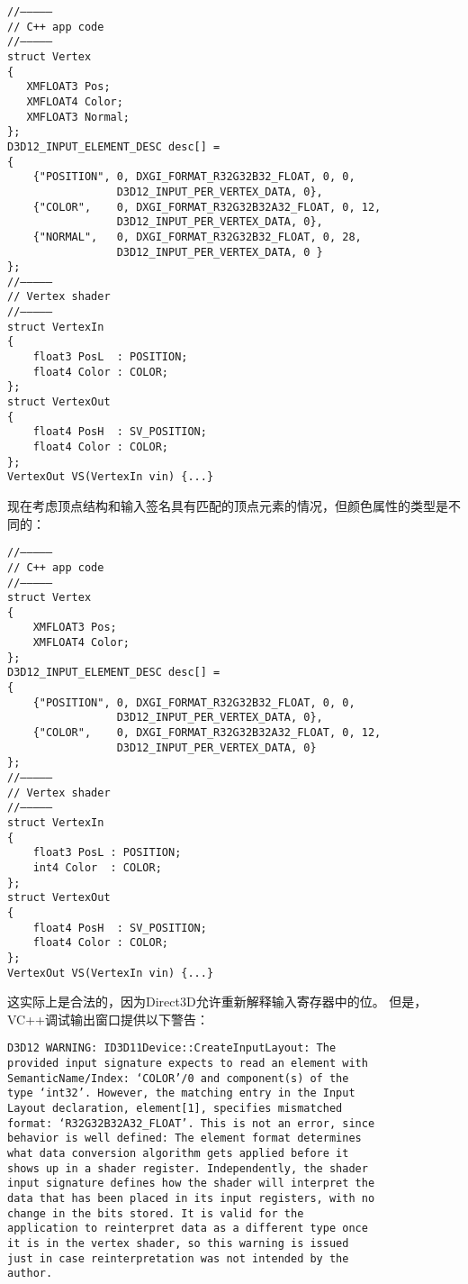 \begin{lstlisting}
//––––—
// C++ app code
//––––—
struct Vertex
{
   XMFLOAT3 Pos;
   XMFLOAT4 Color;
   XMFLOAT3 Normal;
};
D3D12_INPUT_ELEMENT_DESC desc[] =
{
    {"POSITION", 0, DXGI_FORMAT_R32G32B32_FLOAT, 0, 0,
                 D3D12_INPUT_PER_VERTEX_DATA, 0},
    {"COLOR",    0, DXGI_FORMAT_R32G32B32A32_FLOAT, 0, 12,
                 D3D12_INPUT_PER_VERTEX_DATA, 0},
    {"NORMAL",   0, DXGI_FORMAT_R32G32B32_FLOAT, 0, 28,
                 D3D12_INPUT_PER_VERTEX_DATA, 0 }
};
//––––—
// Vertex shader
//––––—
struct VertexIn
{
    float3 PosL  : POSITION;
    float4 Color : COLOR;
};
struct VertexOut
{
    float4 PosH  : SV_POSITION;
    float4 Color : COLOR;
};
VertexOut VS(VertexIn vin) {...}
\end{lstlisting}
\begin{flushleft}
现在考虑顶点结构和输入签名具有匹配的顶点元素的情况，但颜色属性的类型是不同的：\\
\end{flushleft}
\begin{lstlisting}
//––––—
// C++ app code
//––––—
struct Vertex
{
    XMFLOAT3 Pos;
    XMFLOAT4 Color;
};
D3D12_INPUT_ELEMENT_DESC desc[] =
{
    {"POSITION", 0, DXGI_FORMAT_R32G32B32_FLOAT, 0, 0,
                 D3D12_INPUT_PER_VERTEX_DATA, 0},
    {"COLOR",    0, DXGI_FORMAT_R32G32B32A32_FLOAT, 0, 12,
                 D3D12_INPUT_PER_VERTEX_DATA, 0}
};
//––––—
// Vertex shader
//––––—
struct VertexIn
{
    float3 PosL : POSITION;
    int4 Color  : COLOR;
};
struct VertexOut
{
    float4 PosH  : SV_POSITION;
    float4 Color : COLOR;
};
VertexOut VS(VertexIn vin) {...}
\end{lstlisting}

\begin{flushleft}
这实际上是合法的，因为Direct3D允许重新解释输入寄存器中的位。 但是，VC++调试输出窗口提供以下警告：\\
\end{flushleft}
\begin{lstlisting}
D3D12 WARNING: ID3D11Device::CreateInputLayout: The
provided input signature expects to read an element with
SemanticName/Index: ‘COLOR’/0 and component(s) of the
type ‘int32’. However, the matching entry in the Input
Layout declaration, element[1], specifies mismatched
format: ‘R32G32B32A32_FLOAT’. This is not an error, since
behavior is well defined: The element format determines
what data conversion algorithm gets applied before it
shows up in a shader register. Independently, the shader
input signature defines how the shader will interpret the
data that has been placed in its input registers, with no
change in the bits stored. It is valid for the
application to reinterpret data as a different type once
it is in the vertex shader, so this warning is issued
just in case reinterpretation was not intended by the
author.
\end{lstlisting}

